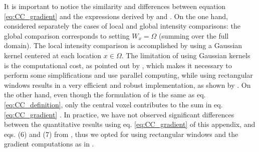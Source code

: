 It is important to notice the similarity and differences between equation \eqref{eq:CC_gradient} and the expressions derived by \cite{Hermosillo2004}
and \cite{Avants2008}. On the one hand, \cite{Hermosillo2004} considered separately the cases of local and global intensity comparisons: the global comparison corresponds to setting $W_{x} = \Omega$ (summing over the full domain). The local intensity comparison is accomplished by using a Gaussian kernel centered at each location $x\in\Omega$. The limitation of using Gaussian kernels is the computational cost, as pointed out by \cite{Hermosillo2004}, which makes it necessary to perform some simplifications and use parallel computing, while using rectangular windows results in a very efficient and robust implementation, as shown by \cite{Avants2008}. On the other hand, even though the formulation of \cite{Avants2008} is the same as eq. \eqref{eq:CC_definition}, only the central voxel contributes to the sum in eq. \eqref{eq:CC_gradient} \citep[see][eqs. 6, 7]{Avants2008}. In practice, we have not observed significant differences between the quantitative results using eq. \eqref{eq:CC_gradient} of this appendix, and eqs. (6) and (7) from \cite{Avants2008}, thus we opted for using rectangular windows and the gradient computations as in \cite{Avants2008}.

